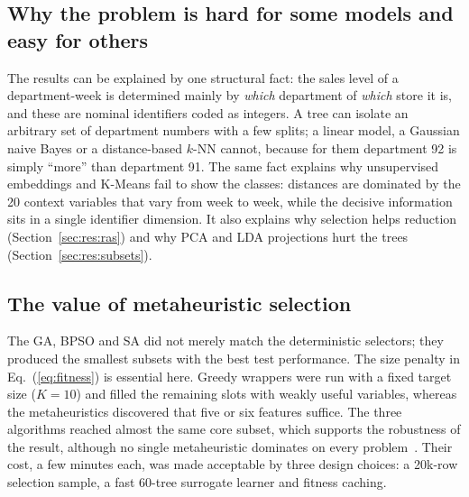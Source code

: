 \subsection{Why the problem is hard for some models and easy for others}
The results can be explained by one structural fact: the sales level of a department-week is determined mainly by \emph{which} department of \emph{which} store it is, and these are nominal identifiers coded as integers. A tree can isolate an arbitrary set of department numbers with a few splits; a linear model, a Gaussian naive Bayes or a distance-based $k$-NN cannot, because for them department 92 is simply ``more'' than department 91. The same fact explains why unsupervised embeddings and K-Means fail to show the classes: distances are dominated by the 20 context variables that vary from week to week, while the decisive information sits in a single identifier dimension. It also explains why selection helps reduction (Section~\ref{sec:res:ras}) and why PCA and LDA projections hurt the trees (Section~\ref{sec:res:subsets}).

\subsection{The value of metaheuristic selection}
The GA, BPSO and SA did not merely match the deterministic selectors; they produced the smallest subsets with the best test performance. The size penalty in Eq.~(\ref{eq:fitness}) is essential here. Greedy wrappers were run with a fixed target size ($K=10$) and filled the remaining slots with weakly useful variables, whereas the metaheuristics discovered that five or six features suffice. The three algorithms reached almost the same core subset, which supports the robustness of the result, although no single metaheuristic dominates on every problem~\cite{wolpert1997}. Their cost, a few minutes each, was made acceptable by three design choices: a 20k-row selection sample, a fast 60-tree surrogate learner and fitness caching.

